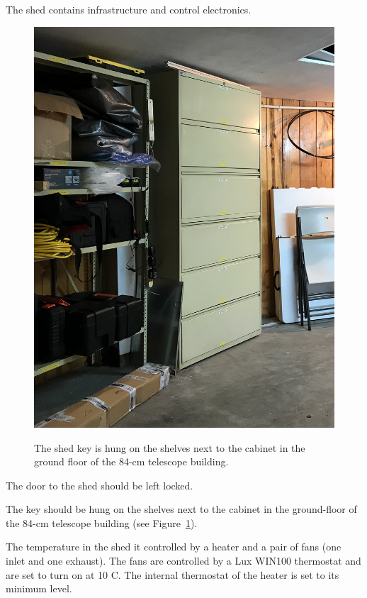 The shed contains infrastructure and control electronics.

\begin{figure}
\begin{center}
\begin{labeled}{\includegraphics[width=0.8\linewidth]{figures/buildings-shed-key.jpg}}
\end{labeled}
\end{center}
\caption{The shed key is hung on the shelves next to the cabinet in the ground floor of the 84-cm telescope building.}
\label{figure:buildings-shed-key}
\end{figure}

The door to the shed should be left locked. 

The key should be hung on the shelves next to the cabinet in the ground-floor of the 84-cm telescope building (see Figure~\ref{figure:buildings-shed-key}).

The temperature in the shed it controlled by a heater and a pair of fans (one inlet and one exhaust). The fans are controlled by a Lux WIN100 thermostat and are set to turn on at 10 C. The internal thermostat of the heater is set to its minimum level.


